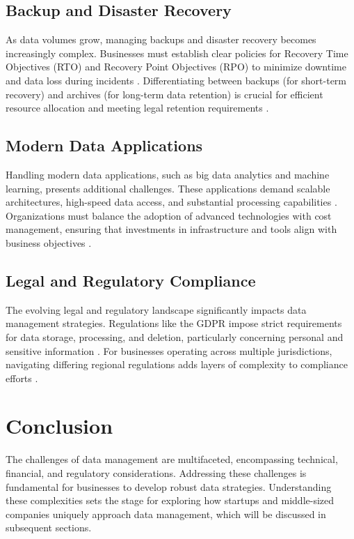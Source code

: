 \documentclass{article}
\begin{document}
\subsection*{Backup and Disaster Recovery}

As data volumes grow, managing backups and disaster recovery becomes increasingly complex. Businesses must establish clear policies for Recovery Time Objectives (RTO) and Recovery Point Objectives (RPO) to minimize downtime and data loss during incidents \cite{bci2018}. Differentiating between backups (for short-term recovery) and archives (for long-term data retention) is crucial for efficient resource allocation and meeting legal retention requirements \cite{igi2019}.

\subsection*{Modern Data Applications}

Handling modern data applications, such as big data analytics and machine learning, presents additional challenges. These applications demand scalable architectures, high-speed data access, and substantial processing capabilities \cite{mckinsey2018}. Organizations must balance the adoption of advanced technologies with cost management, ensuring that investments in infrastructure and tools align with business objectives \cite{forbes2019}.

\subsection*{Legal and Regulatory Compliance}

The evolving legal and regulatory landscape significantly impacts data management strategies. Regulations like the GDPR impose strict requirements for data storage, processing, and deletion, particularly concerning personal and sensitive information \cite{eu2016}. For businesses operating across multiple jurisdictions, navigating differing regional regulations adds layers of complexity to compliance efforts \cite{deloitte2020}.

\section*{Conclusion}

The challenges of data management are multifaceted, encompassing technical, financial, and regulatory considerations. Addressing these challenges is fundamental for businesses to develop robust data strategies. Understanding these complexities sets the stage for exploring how startups and middle-sized companies uniquely approach data management, which will be discussed in subsequent sections.



\end{document}
